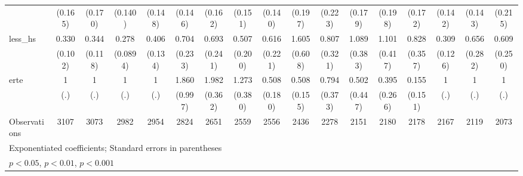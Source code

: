 {\begin{tabular}{l*{16}{c}}
                    &     (0.165)         &     (0.170)         &     (0.140)         &     (0.148)         &     (0.146)         &     (0.162)         &     (0.151)         &     (0.140)         &     (0.197)         &     (0.223)         &     (0.179)         &     (0.198)         &     (0.172)         &     (0.142)         &     (0.143)         &     (0.215)         \\
[1em]
less\_hs             &       0.330\sym{***}&       0.344\sym{**} &       0.278\sym{***}&       0.406\sym{**} &       0.704         &       0.693         &       0.507         &       0.616         &       1.605         &       0.807         &       1.089         &       1.101         &       0.828         &       0.309\sym{**} &       0.656         &       0.609         \\
                    &     (0.102)         &     (0.118)         &    (0.0894)         &     (0.134)         &     (0.233)         &     (0.241)         &     (0.200)         &     (0.221)         &     (0.608)         &     (0.321)         &     (0.383)         &     (0.417)         &     (0.357)         &     (0.126)         &     (0.282)         &     (0.250)         \\
[1em]
erte                &           1         &           1         &           1         &           1         &       1.860         &       1.982\sym{***}&       1.273         &       0.508         &       0.508\sym{*}  &       0.794         &       0.502         &       0.395         &       0.155         &           1         &           1         &           1         \\
                    &         (.)         &         (.)         &         (.)         &         (.)         &     (0.997)         &     (0.362)         &     (0.380)         &     (0.180)         &     (0.155)         &     (0.373)         &     (0.447)         &     (0.266)         &     (0.151)         &         (.)         &         (.)         &         (.)         \\
\hline
Observations        &        3107         &        3073         &        2982         &        2954         &        2824         &        2651         &        2559         &        2556         &        2436         &        2278         &        2151         &        2180         &        2178         &        2167         &        2119         &        2073         \\
\hline\hline
\multicolumn{17}{l}{\footnotesize Exponentiated coefficients; Standard errors in parentheses}\\
\multicolumn{17}{l}{\footnotesize \sym{*} \(p<0.05\), \sym{**} \(p<0.01\), \sym{***} \(p<0.001\)}\\
\end{tabular}
}
